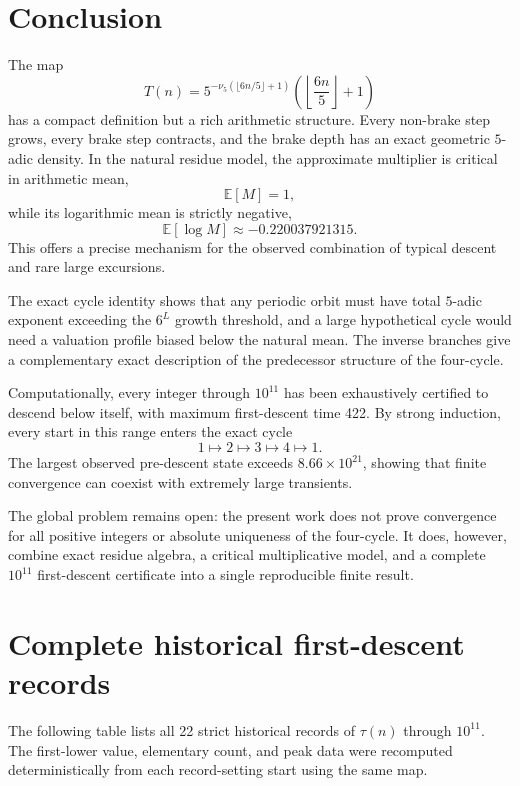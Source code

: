 \documentclass[11pt]{article}
\theoremstyle{definition}
\newcommand{\nuFive}{\nu_5}
\begin{document}
\section{Conclusion}

The map
\[
T(n)=5^{-\nuFive(\lfloor6n/5\rfloor+1)}
\left(\left\lfloor\frac{6n}{5}\right\rfloor+1\right)
\]
has a compact definition but a rich arithmetic structure. Every non-brake step grows, every brake step contracts, and the brake depth has an exact geometric $5$-adic density. In the natural residue model, the approximate multiplier is critical in arithmetic mean,
\[
\mathbb E[M]=1,
\]
while its logarithmic mean is strictly negative,
\[
\mathbb E[\log M]\approx -0.220037921315.
\]
This offers a precise mechanism for the observed combination of typical descent and rare large excursions.

The exact cycle identity shows that any periodic orbit must have total $5$-adic exponent exceeding the $6^L$ growth threshold, and a large hypothetical cycle would need a valuation profile biased below the natural mean. The inverse branches give a complementary exact description of the predecessor structure of the four-cycle.

Computationally, every integer through $10^{11}$ has been exhaustively certified to descend below itself, with maximum first-descent time 422. By strong induction, every start in this range enters the exact cycle
\[
1\mapsto2\mapsto3\mapsto4\mapsto1.
\]
The largest observed pre-descent state exceeds $8.66\times10^{21}$, showing that finite convergence can coexist with extremely large transients.

The global problem remains open: the present work does not prove convergence for all positive integers or absolute uniqueness of the four-cycle. It does, however, combine exact residue algebra, a critical multiplicative model, and a complete $10^{11}$ first-descent certificate into a single reproducible finite result.

\appendix

\section{Complete historical first-descent records}
\label{app:tau-records}

The following table lists all 22 strict historical records of $\tau(n)$ through $10^{11}$. The first-lower value, elementary count, and peak data were recomputed deterministically from each record-setting start using the same map.
\end{document}
